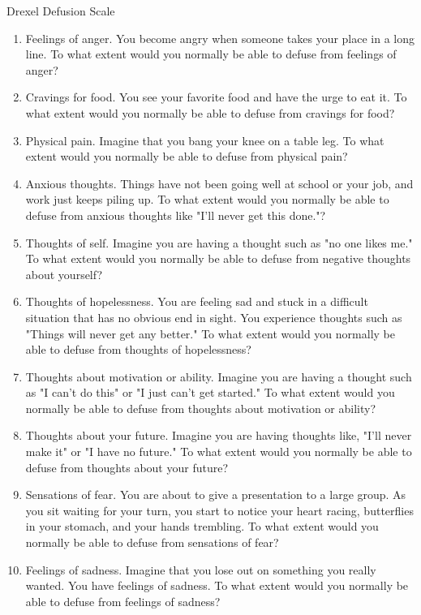 \documentclass[aspectratio=169]{beamer}
\theoremstyle{remark}
\begin{document}
\begin{frame}{Drexel Defusion Scale}
    \begin{enumerate}
        \item Feelings of anger. You become angry when someone takes your place in a long line. To what extent would you normally be able to defuse from feelings of anger?
        \item Cravings for food. You see your favorite food and have the urge to eat it. To what extent would you normally be able to defuse from cravings for food?
        \item Physical pain. Imagine that you bang your knee on a table leg. To what extent would you normally be able to defuse from physical pain?
        \item Anxious thoughts. Things have not been going well at school or your job, and work just keeps piling up. To what extent would you normally be able to defuse from anxious thoughts like "I'll never get this done."?
        \item Thoughts of self. Imagine you are having a thought such as "no one likes me." To what extent would you normally be able to defuse from negative thoughts about yourself?
        \item Thoughts of hopelessness. You are feeling sad and stuck in a difficult situation that has no obvious end in sight. You experience thoughts such as "Things will never get any better." To what extent would you normally be able to defuse from thoughts of hopelessness?
        \item Thoughts about motivation or ability. Imagine you are having a thought such as "I can't do this" or "I just can't get started." To what extent would you normally be able to defuse from thoughts about motivation or ability?
        \item Thoughts about your future. Imagine you are having thoughts like, "I'll never make it" or "I have no future." To what extent would you normally be able to defuse from thoughts about your future?
        \item Sensations of fear. You are about to give a presentation to a large group. As you sit waiting for your turn, you start to notice your heart racing, butterflies in your stomach, and your hands trembling. To what extent would you normally be able to defuse from sensations of fear?
        \item Feelings of sadness. Imagine that you lose out on something you really wanted. You have feelings of sadness. To what extent would you normally be able to defuse from feelings of sadness?
    \end{enumerate}


\end{frame}
\end{document}
